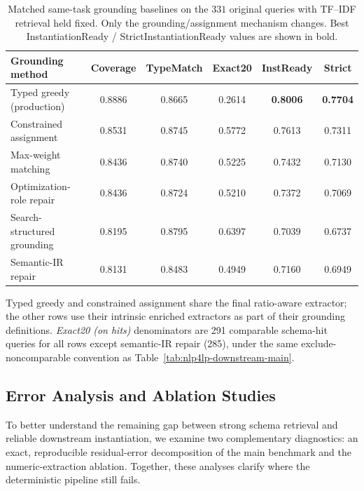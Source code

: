 \documentclass[pdflatex,sn-basic,Numbered]{sn-jnl}
\begin{document}
\begin{table}[t]
  \centering
  \caption{Matched same-task grounding baselines on the $331$ original queries with TF--IDF retrieval held fixed. Only the grounding/assignment mechanism changes. Best InstantiationReady / StrictInstantiationReady values are shown in bold.}
  \label{tab:nlp4lp-grounding-baselines}
  \small
  \setlength{\tabcolsep}{2.8pt}
  \renewcommand{\arraystretch}{1.12}
  \begin{tabular}{@{}lccccc@{}}
    \toprule
    Grounding method & Coverage & TypeMatch & Exact20 & InstReady & Strict \\
    \midrule
    Typed greedy (production) & 0.8886 & 0.8665 & 0.2614 & \textbf{0.8006} & \textbf{0.7704} \\
    Constrained assignment & 0.8531 & 0.8745 & 0.5772 & 0.7613 & 0.7311 \\
    Max-weight matching & 0.8436 & 0.8740 & 0.5225 & 0.7432 & 0.7130 \\
    Optimization-role repair & 0.8436 & 0.8724 & 0.5210 & 0.7372 & 0.7069 \\
    Search-structured grounding & 0.8195 & 0.8795 & 0.6397 & 0.7039 & 0.6737 \\
    Semantic-IR repair & 0.8131 & 0.8483 & 0.4949 & 0.7160 & 0.6949 \\
    \bottomrule
  \end{tabular}

  \vspace{2mm}
  \raggedright
  \footnotesize
  Typed greedy and constrained assignment share the final ratio-aware extractor; the other rows use their intrinsic enriched extractors as part of their grounding definitions. \textit{Exact20 (on hits)} denominators are 291 comparable schema-hit queries for all rows except semantic-IR repair (285), under the same exclude-noncomparable convention as Table~\ref{tab:nlp4lp-downstream-main}.
\end{table}

\subsection{Error Analysis and Ablation Studies}
\label{subsec:exp_error}

To better understand the remaining gap between strong schema retrieval and reliable downstream instantiation, we examine two complementary diagnostics: an exact, reproducible residual-error decomposition of the main benchmark and the numeric-extraction ablation. Together, these analyses clarify where the deterministic pipeline still fails.
\end{document}
